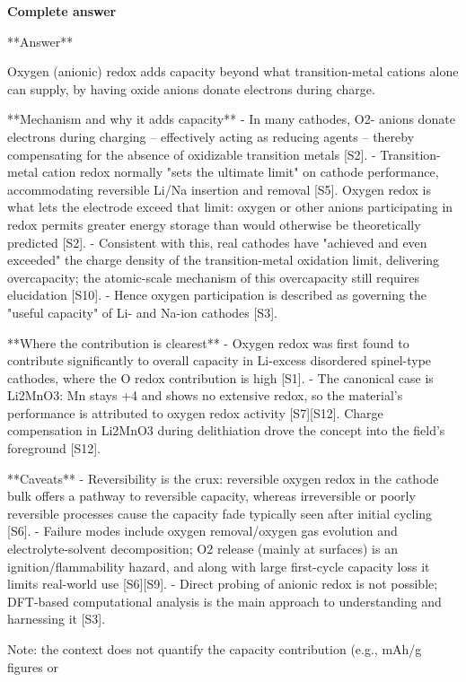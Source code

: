 \documentclass[10pt]{article}
\begin{document}
\textbf{Complete answer}
\begin{AnswerText}
**Answer**

Oxygen (anionic) redox adds capacity beyond what transition-metal cations alone can supply, by having oxide anions donate electrons during charge.

**Mechanism and why it adds capacity**
- In many cathodes, O2- anions donate electrons during charging -- effectively acting as reducing agents -- thereby compensating for the absence of oxidizable transition metals [S2].
- Transition-metal cation redox normally "sets the ultimate limit" on cathode performance, accommodating reversible Li/Na insertion and removal [S5]. Oxygen redox is what lets the electrode exceed that limit: oxygen or other anions participating in redox permits greater energy storage than would otherwise be theoretically predicted [S2].
- Consistent with this, real cathodes have "achieved and even exceeded" the charge density of the transition-metal oxidation limit, delivering overcapacity; the atomic-scale mechanism of this overcapacity still requires elucidation [S10].
- Hence oxygen participation is described as governing the "useful capacity" of Li- and Na-ion cathodes [S3].

**Where the contribution is clearest**
- Oxygen redox was first found to contribute significantly to overall capacity in Li-excess disordered spinel-type cathodes, where the O redox contribution is high [S1].
- The canonical case is Li2MnO3: Mn stays +4 and shows no extensive redox, so the material's performance is attributed to oxygen redox activity [S7][S12]. Charge compensation in Li2MnO3 during delithiation drove the concept into the field's foreground [S12].

**Caveats**
- Reversibility is the crux: reversible oxygen redox in the cathode bulk offers a pathway to reversible capacity, whereas irreversible or poorly reversible processes cause the capacity fade typically seen after initial cycling [S6].
- Failure modes include oxygen removal/oxygen gas evolution and electrolyte-solvent decomposition; O2 release (mainly at surfaces) is an ignition/flammability hazard, and along with large first-cycle capacity loss it limits real-world use [S6][S9].
- Direct probing of anionic redox is not possible; DFT-based computational analysis is the main approach to understanding and harnessing it [S3].

Note: the context does not quantify the capacity contribution (e.g., mAh/g figures or %
\end{AnswerText}
\end{document}
